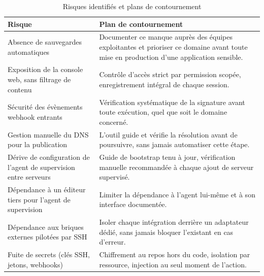 \begin{table}[H]
\centering
\small
\renewcommand{\arraystretch}{1.4}
\begin{tabular}{p{5.5cm}p{8cm}}
\toprule
\textbf{Risque} & \textbf{Plan de contournement} \\
\midrule
Absence de sauvegardes automatiques & Documenter ce manque auprès des
  équipes exploitantes et prioriser ce domaine avant toute mise en
  production d'une application sensible. \\
Exposition de la console web, sans filtrage de contenu & Contrôle
  d'accès strict par permission scopée, enregistrement intégral de
  chaque session. \\
Sécurité des évènements webhook entrants & Vérification systématique de
  la signature avant toute exécution, quel que soit le domaine
  concerné. \\
Gestion manuelle du DNS pour la publication & L'outil guide et vérifie
  la résolution avant de poursuivre, sans jamais automatiser cette
  étape. \\
Dérive de configuration de l'agent de supervision entre serveurs & Guide
  de bootstrap tenu à jour, vérification manuelle recommandée à chaque
  ajout de serveur supervisé. \\
Dépendance à un éditeur tiers pour l'agent de supervision & Limiter la
  dépendance à l'agent lui-même et à son interface documentée. \\
Dépendance aux briques externes pilotées par SSH & Isoler chaque
  intégration derrière un adaptateur dédié, sans jamais bloquer
  l'existant en cas d'erreur. \\
Fuite de secrets (clés SSH, jetons, webhooks) & Chiffrement au repos
  hors du code, isolation par ressource, injection au seul moment de
  l'action. \\
\bottomrule
\end{tabular}
\caption{Risques identifiés et plans de contournement}
\label{tab:risques}
\end{table}